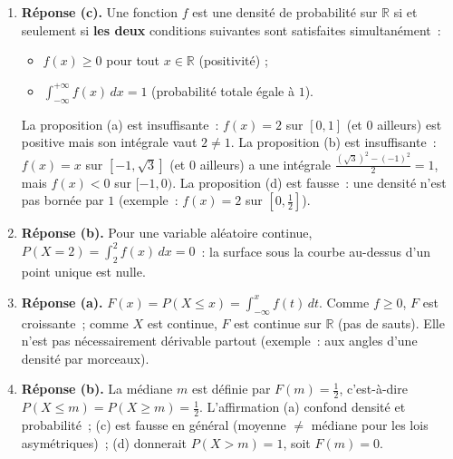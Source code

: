 \documentclass[11pt]{article}
\begin{document}
\begin{corrige}
\begin{enumerate}
\item \textbf{Réponse (c).} Une fonction $f$ est une densité de probabilité sur $\mathbb{R}$ si et seulement si \textbf{les deux} conditions suivantes sont satisfaites simultanément~:
\begin{itemize}
\item $f(x) \geq 0$ pour tout $x \in \mathbb{R}$ (positivité) ;
\item $\displaystyle\int_{-\infty}^{+\infty} f(x)\,dx = 1$ (probabilité totale égale à $1$).
\end{itemize}
La proposition (a) est insuffisante~: $f(x)=2$ sur $[0,1]$ (et $0$ ailleurs) est positive mais son intégrale vaut $2 \neq 1$.
La proposition (b) est insuffisante~: $f(x)=x$ sur $[-1,\sqrt{3}]$ (et $0$ ailleurs) a une intégrale $\frac{(\sqrt{3})^2-(-1)^2}{2}=1$, mais $f(x)<0$ sur $[-1,0)$.
La proposition (d) est fausse~: une densité n'est pas bornée par $1$ (exemple~: $f(x)=2$ sur $[0,\tfrac12]$).
\item \textbf{Réponse (b).} Pour une variable aléatoire continue, $P(X = 2) = \displaystyle\int_{2}^{2} f(x)\,dx = 0$~: la surface sous la courbe au-dessus d'un point unique est nulle.
\item \textbf{Réponse (a).} $F(x) = P(X \leq x) = \displaystyle\int_{-\infty}^{x} f(t)\,dt$. Comme $f \geq 0$, $F$ est croissante~; comme $X$ est continue, $F$ est continue sur $\mathbb{R}$ (pas de sauts). Elle n'est pas nécessairement dérivable partout (exemple~: aux angles d'une densité par morceaux).
\item \textbf{Réponse (b).} La médiane $m$ est définie par $F(m) = \tfrac{1}{2}$, c'est-à-dire $P(X \leq m) = P(X \geq m) = \tfrac{1}{2}$. L'affirmation (a) confond densité et probabilité~; (c) est fausse en général (moyenne $\neq$ médiane pour les lois asymétriques)~; (d) donnerait $P(X>m)=1$, soit $F(m)=0$.
\end{enumerate}
\end{corrige}
\end{document}
